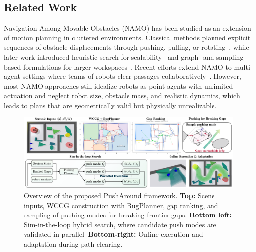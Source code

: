 \subsection{Related Work}\label{subsec:intro-related}

Navigation Among Movable Obstacles (NAMO) has been studied as an extension of
motion planning in cluttered environments. Classical methods planned explicit
sequences of obstacle displacements through pushing, pulling, or
rotating~\cite{stilman2005navigation,stilman2007manipulation}, while later work
introduced heuristic search for scalability~\cite{stilman2007manipulation} and
graph- and sampling-based formulations for larger workspaces~\cite{yao2024local}.
Recent efforts extend NAMO to multi-agent settings where teams of robots clear
passages collaboratively~\cite{tang2024collaborative,ren2025search}. However,
most NAMO approaches still idealize robots as point agents with unlimited
actuation and neglect robot size, obstacle mass, and realistic dynamics, which
leads to plans that are geometrically valid but physically unrealizable.


\begin{figure}[t!]
  \centering
  \includegraphics[width=0.95\linewidth]{figures/overall.png}
  \vspace{-0.1in}
\caption{Overview of the proposed PushAround framework.
\textbf{Top:} Scene inputs, WCCG construction with BugPlanner, gap ranking, and sampling of pushing
modes for breaking frontier gaps.
\textbf{Bottom-left:} Sim-in-the-loop hybrid search, where candidate push modes are validated in parallel.
\textbf{Bottom-right:} Online execution and adaptation during path clearing.}

  \label{fig:overall}
  \vspace{-0.2in}
\end{figure}


